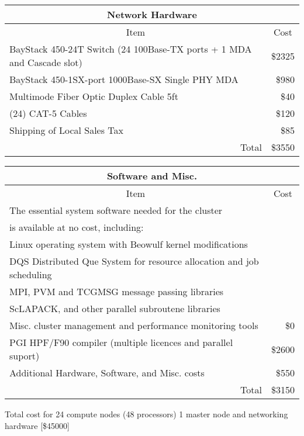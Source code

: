 \begin{tabular}{|l|r|} \hline \hline
\multicolumn{2}{|c|}{Network Hardware} \\ \hline\hline
\multicolumn{1}{|c}{Item} & \multicolumn{1}{c|}{Cost} \\ \hline
BayStack 450-24T Switch (24 100Base-TX ports + 1 MDA and Cascade slot)
                                                                                                      & \$2325 \\ \hline
BayStack 450-1SX-port 1000Base-SX Single PHY MDA & \$980 \\ \hline
Multimode Fiber Optic Duplex Cable 5ft & \$40 \\ \hline
(24) CAT-5 Cables  & \$120 \\ \hline
Shipping of Local Sales Tax & \$85 \\ \hline
\multicolumn{1}{|r|}{Total} & \multicolumn{1}{r|}{\$3550} \\ \hline
\end{tabular}

\bigskip

\begin{tabular}{|l|r|} \hline \hline
\multicolumn{2}{|c|}{Software and Misc.} \\ \hline \hline
\multicolumn{1}{|c}{Item} & \multicolumn{1}{c|}{Cost} \\ \hline
The essential system software needed for the cluster &  \\
is available at no cost, including: & \\ 
Linux operating system with Beowulf kernel modifications & \\
DQS Distributed Que System for resource allocation and job scheduling & \\
MPI, PVM and TCGMSG message passing libraries & \\
ScLAPACK, and other parallel subroutene libraries & \\
Misc. cluster management and performance monitoring tools & \$0 \\ \hline
PGI HPF/F90 compiler (multiple licences and parallel suport) & \$2600 \\ \hline
Additional Hardware,  Software, and Misc. costs & \$550  \\ \hline 
\multicolumn{1}{|r|}{Total} & \$3150 \\ \hline
\end{tabular}

\bigskip

\noindent
Total cost for 24 compute nodes (48 processors) 1 master node and 
networking hardware [\$45000]







